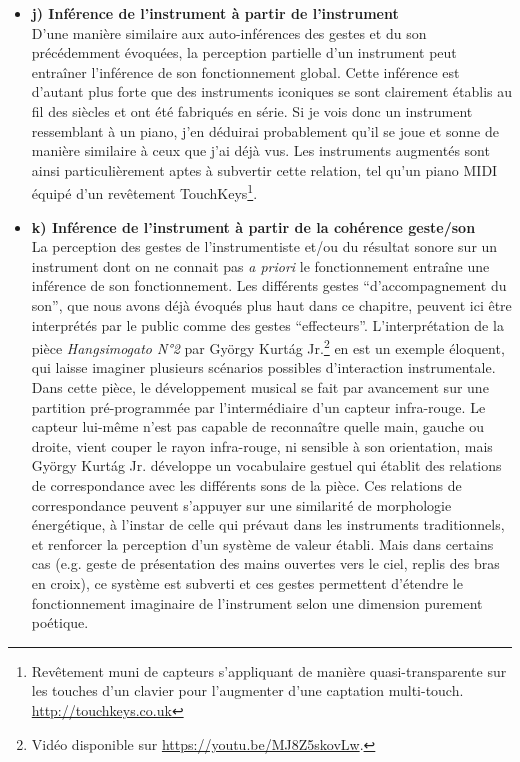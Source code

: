 \begin{itemize}[noitemsep]
	\item \textbf{j) Inférence de l'instrument à partir de l'instrument}\\
	D'une manière similaire aux auto-inférences des gestes et du son précédemment évoquées, la perception partielle d'un instrument peut entraîner l'inférence de son fonctionnement global. Cette inférence est d'autant plus forte que des instruments iconiques se sont clairement établis au fil des siècles et ont été fabriqués en série. Si je vois donc un instrument ressemblant à un piano, j'en déduirai probablement qu'il se joue et sonne de manière similaire à ceux que j'ai déjà vus. Les instruments augmentés sont ainsi particulièrement aptes à subvertir cette relation, tel qu'un piano \gls{MIDI} équipé d'un revêtement TouchKeys\footnote{Revêtement muni de capteurs s'appliquant de manière quasi-transparente sur les touches d'un clavier pour l'augmenter d'une captation multi-touch. \url{http://touchkeys.co.uk}}.

	\item \textbf{k) Inférence de l'instrument à partir de la cohérence geste/son}\\
	La perception des gestes de l'instrumentiste et/ou du résultat sonore sur un instrument dont on ne connait pas \textit{a priori} le fonctionnement entraîne une inférence de son fonctionnement. Les différents gestes ``d'accompagnement du son'', que nous avons déjà évoqués plus haut dans ce chapitre, peuvent ici être interprétés par le public comme des gestes ``effecteurs''. L'interprétation de la pièce \textit{Hangsimogato N°2} par György Kurtág Jr.\footnote{Vidéo disponible sur \url{https://youtu.be/MJ8Z5skovLw}.} en est un exemple éloquent, qui laisse imaginer plusieurs scénarios possibles d'interaction instrumentale. Dans cette pièce, le développement musical se fait par avancement sur une partition pré-programmée par l'intermédiaire d'un capteur infra-rouge. Le capteur lui-même n'est pas capable de reconnaître quelle main, gauche ou droite, vient couper le rayon infra-rouge, ni sensible à son orientation, mais György Kurtág Jr. développe un vocabulaire gestuel qui établit des relations de correspondance avec les différents sons de la pièce. Ces relations de correspondance peuvent s'appuyer sur une similarité de morphologie énergétique, à l'instar de celle qui prévaut dans les instruments traditionnels, et renforcer la perception d'un système de valeur établi. Mais dans certains cas (e.g. geste de présentation des mains ouvertes vers le ciel, replis des bras en croix), ce système est subverti et ces gestes permettent d'étendre le fonctionnement imaginaire de l'instrument selon une dimension purement poétique.


\end{itemize}
